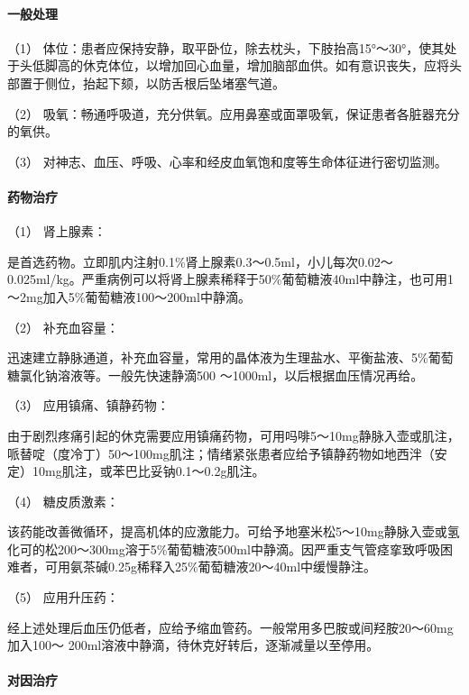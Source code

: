 \paragraph{一般处理}

（1）
体位：患者应保持安静，取平卧位，除去枕头，下肢抬高15°～30°，使其处于头低脚高的休克体位，以增加回心血量，增加脑部血供。如有意识丧失，应将头部置于侧位，抬起下颏，以防舌根后坠堵塞气道。

（2）
吸氧：畅通呼吸道，充分供氧。应用鼻塞或面罩吸氧，保证患者各脏器充分的氧供。

（3） 对神志、血压、呼吸、心率和经皮血氧饱和度等生命体征进行密切监测。

\paragraph{药物治疗}

\hypertarget{text00065.htmlux5cux23CHP2-6-3-2-1}{}
（1） 肾上腺素：

是首选药物。立即肌内注射0.1\%肾上腺素0.3～0.5ml，小儿每次0.02～0.025ml/kg。严重病例可以将肾上腺素稀释于50\%葡萄糖液40ml中静注，也可用1～2mg加入5\%葡萄糖液100～200ml中静滴。

\hypertarget{text00065.htmlux5cux23CHP2-6-3-2-2}{}
（2） 补充血容量：

迅速建立静脉通道，补充血容量，常用的晶体液为生理盐水、平衡盐液、5\%葡萄糖氯化钠溶液等。一般先快速静滴500
～1000ml，以后根据血压情况再给。

\hypertarget{text00065.htmlux5cux23CHP2-6-3-2-3}{}
（3） 应用镇痛、镇静药物：

由于剧烈疼痛引起的休克需要应用镇痛药物，可用吗啡5～10mg静脉入壶或肌注，哌替啶（度冷丁）50～100mg肌注；情绪紧张患者应给予镇静药物如地西泮（安定）10mg肌注，或苯巴比妥钠0.1～0.2g肌注。

\hypertarget{text00065.htmlux5cux23CHP2-6-3-2-4}{}
（4） 糖皮质激素：

该药能改善微循环，提高机体的应激能力。可给予地塞米松5～10mg静脉入壶或氢化可的松200～300mg溶于5\%葡萄糖液500ml中静滴。因严重支气管痉挛致呼吸困难者，可用氨茶碱0.25g稀释入25\%葡萄糖液20～40ml中缓慢静注。

\hypertarget{text00065.htmlux5cux23CHP2-6-3-2-5}{}
（5） 应用升压药：

经上述处理后血压仍低者，应给予缩血管药。一般常用多巴胺或间羟胺20～60mg加入100～
200ml溶液中静滴，待休克好转后，逐渐减量以至停用。

\paragraph{对因治疗}

